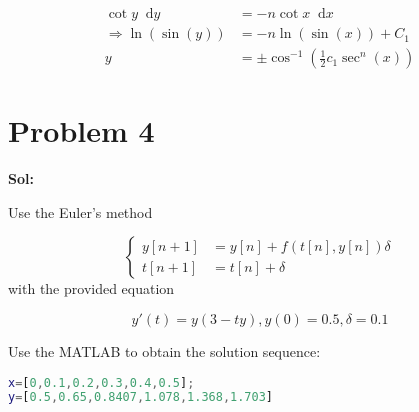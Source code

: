 \documentclass[utf8]{ctexart}
\newcommand{\dif}{\mathop{}\!\mathrm{d}}
\begin{document}
\begin{equation}
    \begin{aligned}
        \cot y \dif y&=-n \cot x \dif x\\
        \Rightarrow \ln (\sin (y))&=-n \ln (\sin (x))+C_1\\
        y&=\pm \cos ^{-1}\left(\frac{1}{2} c_1 \sec^{n} (x)\right)
    \end{aligned}
\end{equation}

\section{Problem 4}

\textbf{Sol:}

Use the Euler's method

\begin{equation}
    \begin{cases}
        y[n+1]&=y[n]+f(t[n],y[n])\delta \\
        t[n+1]&=t[n]+\delta
    \end{cases}
\end{equation}
with the provided equation

\begin{equation}
    y'(t)=y(3-ty),y(0)=0.5,\delta=0.1
\end{equation}

Use the MATLAB to obtain the solution sequence:
\begin{lstlisting}[language=matlab,style=matlab]
x=[0,0.1,0.2,0.3,0.4,0.5];
y=[0.5,0.65,0.8407,1.078,1.368,1.703]
\end{lstlisting}
\end{document}
